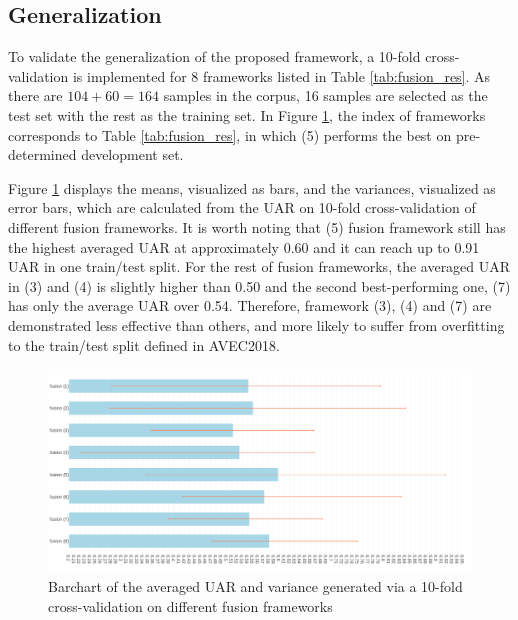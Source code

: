 \subsection{Generalization}

To validate the generalization of the proposed framework, a 10-fold cross-validation is implemented for 8 frameworks listed in Table \ref{tab:fusion_res}. As there are $104 + 60 = 164$ samples in the corpus, 16 samples are selected as the test set with the rest as the training set. In Figure \ref{fig:errorbar}, the index of frameworks corresponds to Table \ref{tab:fusion_res}, in which (5) performs the best on pre-determined development set. 

Figure \ref{fig:errorbar} displays the means, visualized as bars, and the variances, visualized as error bars, which are calculated from the UAR on 10-fold cross-validation of different fusion frameworks. It is worth noting that (5) fusion framework still has the highest averaged UAR at approximately 0.60 and it can reach up to 0.91 UAR in one train/test split. For the rest of fusion frameworks, the averaged UAR in (3) and (4) is slightly higher than 0.50 and the second best-performing one, (7) has only the average UAR over 0.54. Therefore, framework (3), (4) and (7) are demonstrated less effective than others, and more likely to suffer from overfitting to the train/test split defined in AVEC2018. 

\begin{figure}[htb]
    \centering
    \includegraphics[width=\textwidth]{images/results/barchart_cv.png}
    \caption{Barchart of the averaged UAR and variance generated via a 10-fold cross-validation on different fusion frameworks}
    \label{fig:errorbar}
\end{figure}




